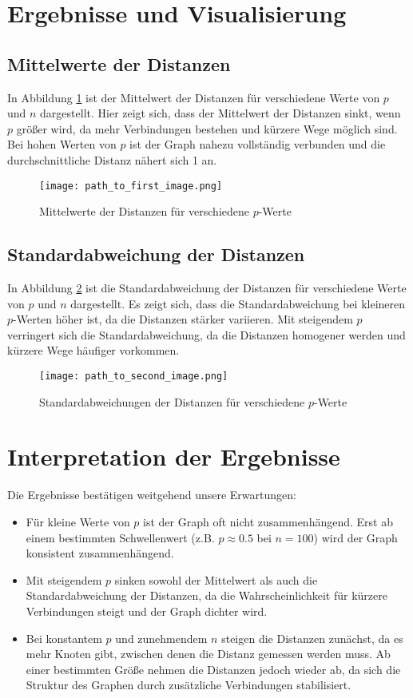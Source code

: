 \section{Ergebnisse und Visualisierung}

\subsection{Mittelwerte der Distanzen}
In Abbildung \ref{fig:mean_distances} ist der Mittelwert der Distanzen für verschiedene Werte von $p$ und $n$ dargestellt. Hier zeigt sich, dass der Mittelwert der Distanzen sinkt, wenn $p$ größer wird, da mehr Verbindungen bestehen und kürzere Wege möglich sind. Bei hohen Werten von $p$ ist der Graph nahezu vollständig verbunden und die durchschnittliche Distanz nähert sich 1 an.

\begin{figure}[H]
    \centering
    \texttt{[image: path\_to\_first\_image.png]}
    \caption{Mittelwerte der Distanzen für verschiedene $p$-Werte}
    \label{fig:mean_distances}
\end{figure}

\subsection{Standardabweichung der Distanzen}
In Abbildung \ref{fig:std_distances} ist die Standardabweichung der Distanzen für verschiedene Werte von $p$ und $n$ dargestellt. Es zeigt sich, dass die Standardabweichung bei kleineren $p$-Werten höher ist, da die Distanzen stärker variieren. Mit steigendem $p$ verringert sich die Standardabweichung, da die Distanzen homogener werden und kürzere Wege häufiger vorkommen.

\begin{figure}[H]
    \centering
    \texttt{[image: path\_to\_second\_image.png]}
    \caption{Standardabweichungen der Distanzen für verschiedene $p$-Werte}
    \label{fig:std_distances}
\end{figure}

\section{Interpretation der Ergebnisse}
Die Ergebnisse bestätigen weitgehend unsere Erwartungen:
\begin{itemize}
    \item Für kleine Werte von $p$ ist der Graph oft nicht zusammenhängend. Erst ab einem bestimmten Schwellenwert (z.B. $p \approx 0.5$ bei $n = 100$) wird der Graph konsistent zusammenhängend.
    \item Mit steigendem $p$ sinken sowohl der Mittelwert als auch die Standardabweichung der Distanzen, da die Wahrscheinlichkeit für kürzere Verbindungen steigt und der Graph dichter wird.
    \item Bei konstantem $p$ und zunehmendem $n$ steigen die Distanzen zunächst, da es mehr Knoten gibt, zwischen denen die Distanz gemessen werden muss. Ab einer bestimmten Größe nehmen die Distanzen jedoch wieder ab, da sich die Struktur des Graphen durch zusätzliche Verbindungen stabilisiert.
\end{itemize}

